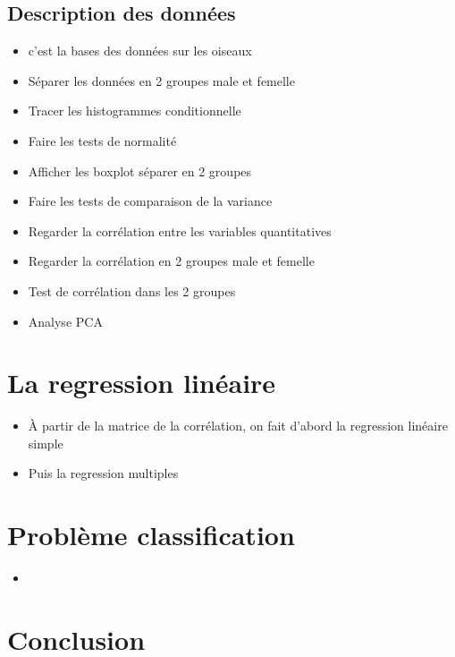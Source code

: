 \documentclass[12pt]{article}
\begin{document}
\subsection{Description des données}
\begin{itemize}
    \item c'est la bases des donn\'ees sur les oiseaux
    \item S\'eparer les donn\'ees en 2 groupes male et femelle
    \item Tracer les histogrammes conditionnelle
    \item Faire les tests de normalit\'e
    \item Afficher les boxplot s\'eparer en 2 groupes
    \item Faire les tests de comparaison de la variance
    \item Regarder la corr\'elation entre les variables quantitatives
    \item Regarder la corr\'elation en 2 groupes male et femelle
    \item Test de corr\'elation dans les 2 groupes
    \item Analyse PCA
\end{itemize}



\section{La regression lin\'eaire}
\begin{itemize}
\item \`A partir de la matrice de la corr\'elation, on fait d'abord la regression lin\'eaire simple
\item Puis la regression multiples
\end{itemize}


\section{Probl\`eme classification} 
\begin{itemize}
\item 
\end{itemize}

\section{Conclusion} 


  


%
\end{document}
